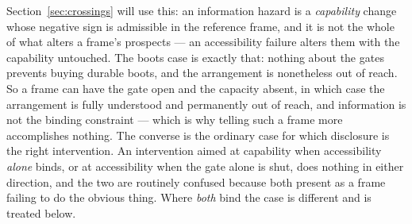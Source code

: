 \documentclass[11pt,a4paper]{article}
\theoremstyle{remark}\newtheorem{remark}[definition]{Remark}
\begin{document}
Section~\ref{sec:crossings} will use this: an information hazard is
a \emph{capability} change whose negative sign is admissible in the reference frame, and it is not the
whole of what alters a frame's prospects --- an accessibility failure alters them with the capability untouched. The boots case is
exactly that: nothing about the gates prevents buying durable boots, and the arrangement is nonetheless
out of reach. So a frame can have the gate open and the
capacity absent, in which case the arrangement is fully understood and permanently out of reach, and
information is not the binding constraint --- which is why telling such a frame more accomplishes
nothing. The converse is the ordinary case for which disclosure is the right intervention. An intervention aimed at capability when accessibility \emph{alone} binds, or at accessibility when the
gate alone is shut, does nothing in either direction, and the two are routinely confused because both
present as a frame failing to do the obvious thing. Where \emph{both} bind the case is different and is
treated below.
\end{document}
